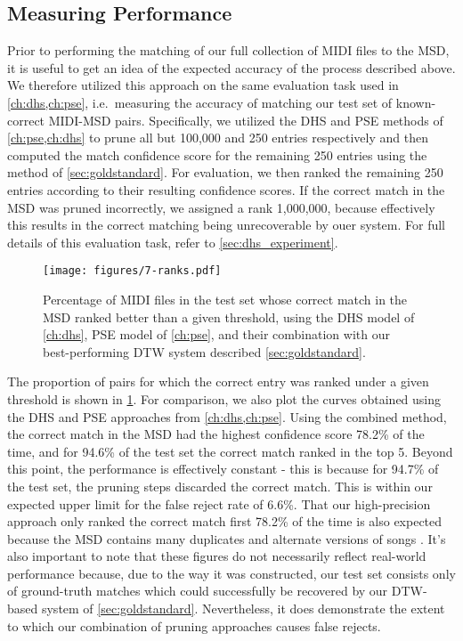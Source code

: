 \subsection{Measuring Performance}

Prior to performing the matching of our full collection of MIDI files to the MSD, it is useful to get an idea of the expected accuracy of the process described above.
We therefore utilized this approach on the same evaluation task used in \cref{ch:dhs,ch:pse}, i.e.\ measuring the accuracy of matching our test set of known-correct MIDI-MSD pairs.
Specifically, we utilized the DHS and PSE methods of \cref{ch:pse,ch:dhs} to prune all but 100,000 and 250 entries respectively and then computed the match confidence score for the remaining 250 entries using the method of \cref{sec:goldstandard}.
For evaluation, we then ranked the remaining 250 entries according to their resulting confidence scores.
If the correct match in the MSD was pruned incorrectly, we assigned a rank 1,000,000, because effectively this results in the correct matching being unrecoverable by ouer system.
For full details of this evaluation task, refer to \cref{sec:dhs_experiment}.

\begin{figure}
  \texttt{[image: figures/7-ranks.pdf]}
  \caption[Percentage of the test set below a given rank]{Percentage of MIDI files in the test set whose correct match in the MSD ranked better than a given threshold, using the DHS model of \cref{ch:dhs}, PSE model of \cref{ch:pse}, and their combination with our best-performing DTW system described \cref{sec:goldstandard}.}
  \label{fig:combined_ranks}
\end{figure}

The proportion of pairs for which the correct entry was ranked under a given threshold is shown in \cref{fig:combined_ranks}.
For comparison, we also plot the curves obtained using the DHS and PSE approaches from \cref{ch:dhs,ch:pse}.
Using the combined method, the correct match in the MSD had the highest confidence score 78.2\% of the time, and for 94.6\% of the test set the correct match ranked in the top 5.
Beyond this point, the performance is effectively constant - this is because for 94.7\% of the test set, the pruning steps discarded the correct match.
This is within our expected upper limit for the false reject rate of 6.6\%.
That our high-precision approach only ranked the correct match first 78.2\% of the time is also expected because the MSD contains many duplicates and alternate versions of songs \cite{bertin2012large}.
It's also important to note that these figures do not necessarily reflect real-world performance because, due to the way it was constructed, our test set consists only of ground-truth matches which could successfully be recovered by our DTW-based system of \cref{sec:goldstandard}.
Nevertheless, it does demonstrate the extent to which our combination of pruning approaches causes false rejects.

